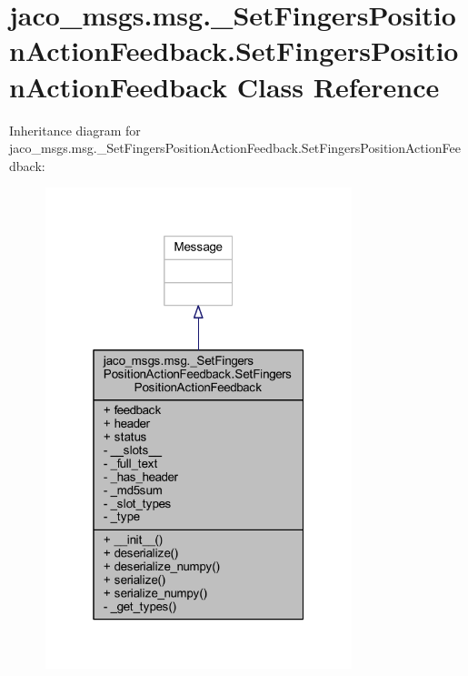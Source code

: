 \hypertarget{classjaco__msgs_1_1msg_1_1__SetFingersPositionActionFeedback_1_1SetFingersPositionActionFeedback}{}\section{jaco\+\_\+msgs.\+msg.\+\_\+\+Set\+Fingers\+Position\+Action\+Feedback.\+Set\+Fingers\+Position\+Action\+Feedback Class Reference}
\label{classjaco__msgs_1_1msg_1_1__SetFingersPositionActionFeedback_1_1SetFingersPositionActionFeedback}


Inheritance diagram for jaco\+\_\+msgs.\+msg.\+\_\+\+Set\+Fingers\+Position\+Action\+Feedback.\+Set\+Fingers\+Position\+Action\+Feedback\+:
\nopagebreak
\begin{figure}[H]
\begin{center}
\leavevmode
\includegraphics[width=253pt]{d9/dca/classjaco__msgs_1_1msg_1_1__SetFingersPositionActionFeedback_1_1SetFingersPositionActionFeedback__inherit__graph}
\end{center}
\end{figure}


